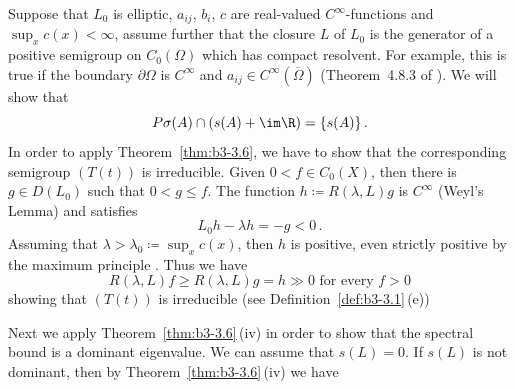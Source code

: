 \begin{examples}
\begin{enumerate}[\upshape (i), wide, labelindent=.25em]
	Suppose that $L_{0}$ is elliptic, $a_{ij}$, $b_{i}$, $c$ are real-valued $C^{\infty}$-functions and $\sup_x c(x) < \infty$, assume further that the closure $L$ of\/ $L_{0}$ is the generator of a positive semigroup on $C_{0}(\Omega)$ which has compact resolvent.
	For example, this is true if the boundary  $\partial\Omega$ is $C^{\infty}$ and $a_{ij} \in C^{\infty}(\overline{\Omega})$ (\cf Theorem~4.8.3 of \textcite{fattorini:1983}).
	We will show that 
    \[
    P\sigma(A)\cap(s(A) + \im\R) = \{s(A)\}\,.
    \]
	In order to apply Theorem~\ref{thm:b3-3.6}, we have to show that the corresponding semigroup $(T(t))$ is irreducible.
	Given $0 < f \in C_{0}(X)$, then there is $g \in D(L_{0})$ such that $0 < g \leq f$. The function 
	$h \coloneq R(\lambda,L)g$ is $C^{\infty}$ (Weyl's Lemma) and satisfies 
    \[
    L_{0}h - \lambda h = -g < 0\,.
    \]
	Assuming that $\lambda > \lambda_{0} \coloneqq \sup_x c(x)$, then $h$ is positive, even strictly positive by the maximum principle \textcite[Chapter~2, Theorem~6]{protterweinberger:1967}.
	Thus we have  
    \[ 
    R(\lambda,L)f \geq R(\lambda,L)g = h \gg 0 \text{ for every } f>0 
    \]
    showing that $(T(t))$ is irreducible (see Definition~\ref{def:b3-3.1}\,(e))

Next we apply Theorem~\ref{thm:b3-3.6}\,(iv) in order to show that the spectral bound is a dominant eigenvalue.
	We can assume that $s(L) = 0$.
	If\/ $s(L)$ is not dominant, then by Theorem~\ref{thm:b3-3.6}\,(iv) we have
	

\end{enumerate}
\end{examples}
